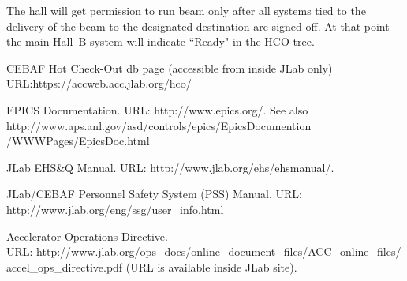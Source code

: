 \documentclass[11pt]{report}
\begin{document}
The hall will get permission to run beam only after all systems tied to the delivery of the 
beam to the designated destination are signed off. At that point the main Hall~B system will 
indicate ``Ready" in the HCO tree.

































%





\begin{thebibliography}{99}
 CEBAF Hot Check-Out db page (accessible from inside JLab only)
URL:https://accweb.acc.jlab.org/hco/

EPICS Documentation. URL: http://www.epics.org/. 
See also http://www.aps.anl.gov/asd/controls/epics/EpicsDocumention\\/WWWPages/EpicsDoc.html

JLab EHS\&Q Manual. URL: http://www.jlab.org/ehs/ehsmanual/.

JLab/CEBAF Personnel Safety System (PSS) Manual. URL: http://www.jlab.org/eng/ssg/user\_info.html

Accelerator Operations Directive. \\
URL: http://www.jlab.org/ops\_docs/online\_document\_files/ACC\_online\_files/\\accel\_ops\_directive.pdf (URL is available inside JLab site). 

\end{thebibliography}
\end{document}
